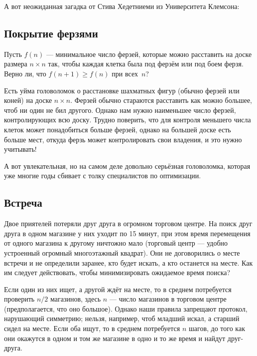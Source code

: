 \medskip

А вот неожиданная загадка от Стива Хедетниеми из Университета Клемсона:

\subsection*{Покрытие ферзями}

Пусть $f(n)$ --- минимальное число ферзей, которые можно расставить на доске размера $n \times n$ так, чтобы каждая клетка была под ферзём или под боем ферзя.
Верно ли, что $f(n + 1) \geqslant f(n)$ при всех~$n$?

\medskip

Есть уйма головоломок о расстановке шахматных фигур (обычно ферзей или коней) на доске $n \times n$.
Ферзей обычно стараются расставить как можно большее, чтоб ни один не бил другого.
Однако нам нужно наименьшее число ферзей, контролирующих всю доску.
Трудно поверить, что для контроля меньшего числа клеток может понадобиться больше ферзей, однако на большей доске есть больше мест, откуда ферзь может контролировать свои владения, и это нужно учитывать!

\medskip

А вот увлекательная, но на самом деле довольно серьёзная головоломка, которая уже многие годы сбивает с толку специалистов по оптимизации.

\subsection*{Встреча}

Двое приятелей потеряли друг друга в огромном торговом центре. %
На поиск друг друга в одном магазине у них уходит по 15 минут,
при этом время перемещения от одного магазина к другому ничтожно мало
(торговый центр --- удобно устроенный огромный многоэтажный квадрат).
Они не договорились о месте встречи и не определили заранее, кто будет искать, а кто останется на месте.
Как им следует действовать, чтобы минимизировать ожидаемое время поиска?

\medskip

Если один из них ищет, а другой ждёт на месте, то в среднем потребуется проверить $n/2$ магазинов, здесь $n$ --- число магазинов в торговом центре (предполагается, что оно большое).
Однако наши правила запрещают протокол, нарушающий симметрию;
нельзя, например, чтоб младший искал, а старший сидел на месте.
Если оба ищут, то в среднем потребуется $n$ шагов, до того как они окажутся в одном и том же магазине в одно и то же время и найдут друг-друга.

